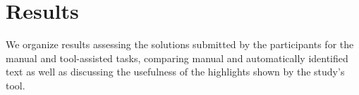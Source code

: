 
\section{Results}
\label{cp6:results}

We organize results assessing the solutions submitted by the participants for the manual and tool-assisted tasks, 
comparing manual and automatically identified text as well as discussing the usefulness of the highlights shown 
by the study's tool.




